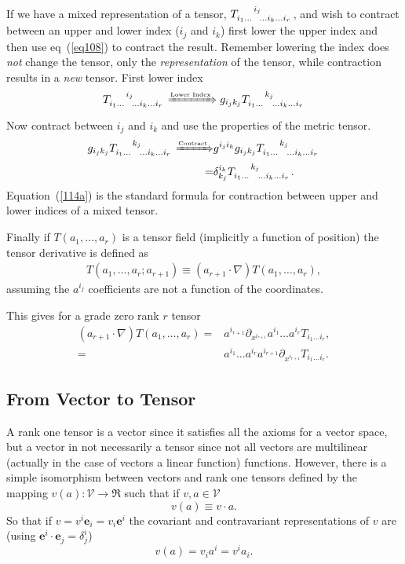 \documentclass[12pt]{report}
\newcommand{\bm}[1]{\boldsymbol{#1}}
\newcommand{\lp}{\left (}
\newcommand{\rp}{\right )}
\newcommand{\f}[2]{{#1}\lp {#2} \rp}
\newcommand{\be}{\begin{equation}}
\newcommand{\ee}{\end{equation}}
\newcommand{\eb}{\bm{e}}
\begin{document}
If we have a mixed representation of a tensor, $T\indices{_{i_{1}\dots}^{i_{j}}_{\dots i_{k}\dots i_{r}}}$, 
and wish to contract between an upper and lower index ($i_{j}$ and $i_{k}$) first lower the upper index and then use eq~(\ref{eq108})
to contract the result.  Remember lowering the index does \emph{not} change the tensor, only the \emph{representation} of the tensor,
while contraction results in a \emph{new} tensor.  First lower index
\be
	T\indices{_{i_{1}\dots}^{i_{j}}_{\dots i_{k}\dots i_{r}}} \xRightarrow{\mbox{\tiny Lower Index}} g_{i_{j}k_{j}}T\indices{_{i_{1}\dots}^{k_{j}}_{\dots i_{k}\dots i_{r}}}	
\ee
Now contract between $i_{j}$ and $i_{k}$ and use the properties of the metric tensor.
\begin{align}
	g_{i_{j}k_{j}}T\indices{_{i_{1}\dots}^{k_{j}}_{\dots i_{k}\dots i_{r}}} \xRightarrow{\mbox{\tiny Contract}}&
				g^{i_{j}i_{k}}g_{i_{j}k_{j}}T\indices{_{i_{1}\dots}^{k_{j}}_{\dots i_{k}\dots i_{r}}} \nonumber \\
				=& \delta_{k_{j}}^{i_{k}}T\indices{_{i_{1}\dots}^{k_{j}}_{\dots i_{k}\dots i_{r}}}. \label{114a}
\end{align}
Equation~(\ref{114a}) is the standard formula for contraction between upper and lower indices of a mixed tensor.

Finally if $\f{T}{a_{1},\dots,a_{r}}$ is a tensor field (implicitly a function of position) the tensor derivative is defined as
\begin{align}
	\f{T}{a_{1},\dots,a_{r};a_{r+1}} \equiv \lp a_{r+1}\cdot\nabla\rp\f{T}{a_{1},\dots,a_{r}},
\end{align}
assuming the $a^{i_{j}}$ coefficients are not a function of the coordinates.

This gives for a grade zero rank $r$ tensor
\begin{align}
	\lp a_{r+1}\cdot\nabla\rp\f{T}{a_{1},\dots,a_{r}} =& a^{i_{r+1}}\partial_{x^{i_{r+1}}}a^{i_{1}}\dots a^{i_{r}}
													    T_{i_{1}\dots i_{r}}, \nonumber \\
													 =& a^{i_{1}}\dots a^{i_{r}}a^{i_{r+1}}
													    \partial_{x^{i_{r+1}}}T_{i_{1}\dots i_{r}}. 
\end{align}

\subsection{From Vector to Tensor}

A rank one tensor is a vector since it satisfies all the axioms for a vector space, but a vector in not necessarily a tensor since not all vectors
are multilinear (actually in the case of vectors a linear function) functions.  However, there is a simple isomorphism between vectors and 
rank one tensors defined by the mapping $\f{v}{a}:\mathcal{V}\rightarrow\Re$ such that if $v,a \in\mathcal{V}$
\be
	\f{v}{a} \equiv v\cdot a.
\ee
So that if $v = v^{i}\eb_{i} = v_{i}\eb^{i}$ the covariant and contravariant representations of $v$ are 
(using $\eb^{i}\cdot\eb_{j} = \delta^{i}_{j}$)
\be
	\f{v}{a} = v_{i}a^{i} = v^{i}a_{i}.
\ee
\end{document}
